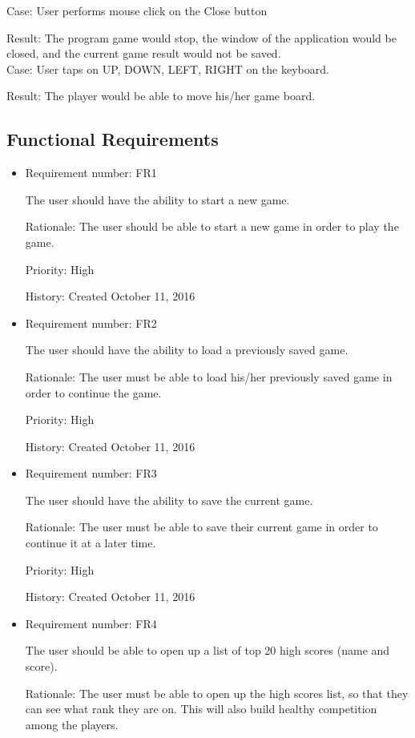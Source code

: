 \documentclass[12pt,letterpaper]{article}
\begin{document}
Case: User performs mouse click on the Close button

Result: The program game would stop, the window of the application would be closed, and the current game result would not be saved.\\

Case: User taps on UP, DOWN, LEFT, RIGHT on the keyboard.

Result: The player would be able to move his/her game board.\\


	\subsection{Functional Requirements}
	\begin{itemize}
		\item Requirement number: FR1  
		
		The user should have the ability to start a new game.  
		 
		Rationale: The user should be able to start a new game in order to play the game.
		
		Priority: High

		History: Created October 11, 2016

		\item Requirement number: FR2  
		
		 The user should have the ability to load a previously saved game.

		Rationale: The user must be able to load his/her previously saved game in order to continue the game.

		Priority: High

		History: Created October 11, 2016

		\item Requirement number: FR3

		The user should have the ability to save the current game.

		Rationale: The user must be able to save their current game in order to continue it at a later time.

		Priority: High

		History: Created October 11, 2016

		\item Requirement number: FR4

		The user should be able to open up a list of top 20 high scores (name and score). 

		Rationale: The user must be able to open up the high scores list, so that they can see what rank they are on. This will also build healthy competition among the players.


\end{itemize}
\end{document}
